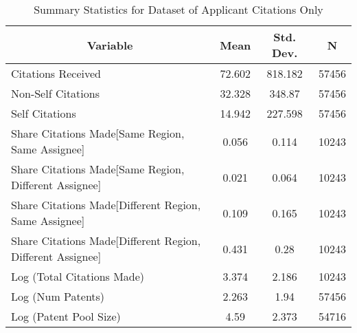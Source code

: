 \begin{table}[htbp]\centering \caption{Summary Statistics for Dataset of Applicant Citations Only \label{a.sumstat}}
\begin{tabular}{l c c  c}\hline\hline
\multicolumn{1}{c}{\textbf{Variable}} & \textbf{Mean}
 & \textbf{Std. Dev.} & \textbf{N}\\ \hline
Citations Received & 72.602 & 818.182  & 57456\\
Non-Self Citations & 32.328 & 348.87  & 57456\\
Self Citations & 14.942 & 227.598  & 57456\\
Share Citations Made[Same Region, Same Assignee] & 0.056 & 0.114  & 10243\\
Share Citations Made[Same Region, Different Assignee] & 0.021 & 0.064  & 10243\\
Share Citations Made[Different Region, Same Assignee] & 0.109 & 0.165  & 10243\\
Share Citations Made[Different Region, Different Assignee] & 0.431 & 0.28  & 10243\\
Log (Total Citations Made) & 3.374 & 2.186  & 10243\\
Log (Num Patents) & 2.263 & 1.94  & 57456\\
Log (Patent Pool Size) & 4.59 & 2.373  & 54716\\\hline
\end{tabular}
\end{table}
